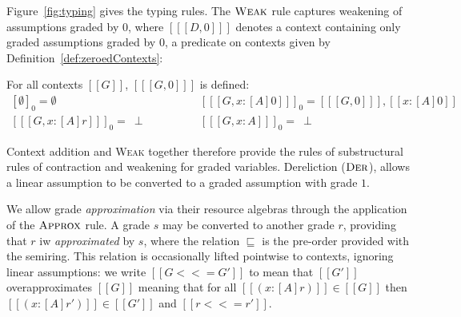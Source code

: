 Figure~\ref{fig:typing} gives the typing rules. The $\textsc{Weak}$ rule
captures weakening of assumptions graded by $0$, where $[[ [ D , 0 ] ]]$ denotes
a context containing only graded assumptions graded by $0$, a predicate on
contexts given by Definition~\ref{def:zeroedContexts}: 
\begin{definition}
  \label{def:zeroedContexts}
  For all contexts $[[ G ]]$, $ [[ [ G, 0 ] ]]$ is defined:
\begin{align*} 
    [ \emptyset ]_0 = \emptyset
    \qquad & \qquad
    [[ [ {G, x : [A] 0} ] ]]_0 = [[ [ G, 0 ] ]], [[ {x : [ A ] 0} ]] 
    \\
    [[ [ {G, x : [A] r} ] ]]_0 =\ \perp 
    \qquad & \qquad
   [[ [ G, x : A ] ]]_0 =\ \perp
\end{align*}
\end{definition}

Context addition and \textsc{Weak} together therefore provide the rules of
substructural rules of contraction and weakening for graded variables.
Dereliction ($\textsc{Der}$), allows a linear assumption to be converted to a
graded assumption with grade $1$. 

We allow grade \textit{approximation} via their resource algebras through the
application of the $\textsc{Approx}$ rule. A grade $s$ may be converted to
another grade $r$, providing that $r$ iw \textit{approximated} by $s$, where the
relation $\sqsubseteq$ is the pre-order provided with the semiring. This
relation is occasionally lifted pointwise to contexts, ignoring linear
assumptions: we write $[[ G <<= G' ]]$ to mean that $[[ G' ]]$ overapproximates
$[[ G ]]$ meaning that for all $[[ (x : [A] r) ]] \in [[ G ]]$ then $[[ (x : [A]
r') ]] \in [[ G' ]]$ and $[[ r <<= r' ]]$. 

